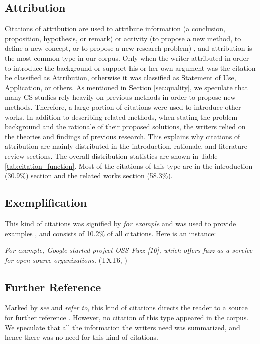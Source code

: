 \subsection{Attribution}
Citations of attribution are used to attribute information (a conclusion, proposition, hypothesis, or remark) or activity (to propose a new method, to define a new concept, or to propose a new research problem) \citep{petric_rhetorical_2007}, and attribution is the most common type in our corpus. Only when the writer attributed in order to introduce the background or support his or her own argument was the citation be classified as Attribution, otherwise it was classified as Statement of Use, Application, or others. As mentioned in Section \ref{sec:quality}, we speculate that many CS studies rely heavily on previous methods in order to propose new methods. Therefore, a large portion of citations were used to introduce other works. In addition to describing related methods, when stating the problem background and the rationale of their proposed solutions, the writers relied on the theories and findings of previous research. This explains why citations of attribution are mainly distributed in the introduction, rationale, and literature review sections. The overall distribution statistics are shown in Table \ref{tab:citation_function}. Most of the citations of this type are in the introduction (30.9\%) section and the related works section (58.3\%).

\subsection{Exemplification}
This kind of citations was signified by \textit{for example} and was used to provide examples \citep{petric_rhetorical_2007}, and consists of 10.2\% of all citations. Here is an instance:

\textit{For example, Google started project OSS-Fuzz [10], which offers fuzz-as-a-service for open-source organizations.} (TXT6, \citealp{liang_fuzz_2018})

\subsection{Further Reference}
Marked by \textit{see} and \textit{refer to}, this kind of citations directs the reader to a source for further reference \citep{petric_rhetorical_2007}. However, no citation of this type appeared in the corpus. We speculate that all the information the writers need was summarized, and hence there was no need for this kind of citations.

